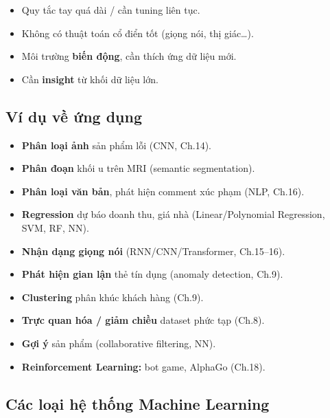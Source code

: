 \documentclass[12pt,a4paper]{article}
\begin{document}
\begin{dongco}[title={Khi nào nên chọn ML?}]
\begin{itemize}
  \item Quy tắc tay quá dài / cần tuning liên tục.
  \item Không có thuật toán cổ điển tốt (giọng nói, thị giác\ldots).
  \item Môi trường \textbf{biến động}, cần thích ứng dữ liệu mới.
  \item Cần \textbf{insight} từ khối dữ liệu lớn.
\end{itemize}
\end{dongco}

\subsection{Ví dụ về ứng dụng}

\begin{ungdung}[title={Một số nhiệm vụ ML điển hình}]
\begin{itemize}
  \item \textbf{Phân loại ảnh} sản phẩm lỗi (CNN, Ch.14).
  \item \textbf{Phân đoạn} khối u trên MRI (semantic segmentation).
  \item \textbf{Phân loại văn bản}, phát hiện comment xúc phạm (NLP, Ch.16).
  \item \textbf{Regression} dự báo doanh thu, giá nhà (Linear/Polynomial Regression, SVM, RF, NN).
  \item \textbf{Nhận dạng giọng nói} (RNN/CNN/Transformer, Ch.15--16).
  \item \textbf{Phát hiện gian lận} thẻ tín dụng (anomaly detection, Ch.9).
  \item \textbf{Clustering} phân khúc khách hàng (Ch.9).
  \item \textbf{Trực quan hóa / giảm chiều} dataset phức tạp (Ch.8).
  \item \textbf{Gợi ý} sản phẩm (collaborative filtering, NN).
  \item \textbf{Reinforcement Learning:} bot game, AlphaGo (Ch.18).
\end{itemize}
\end{ungdung}

\subsection{Các loại hệ thống Machine Learning}
\end{document}
